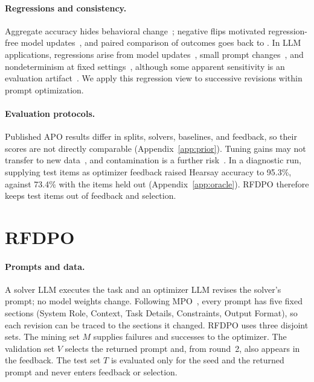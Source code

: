 \documentclass[11pt]{article}
\begin{document}
\paragraph{Regressions and consistency.}
Aggregate accuracy hides behavioral change~\citep{ribeiro2020checklist}; negative flips motivated regression-free model updates~\citep{yan2021positive}, and paired comparison of outcomes goes back to \citet{mcnemar1947sampling}. In LLM applications, regressions arise from model updates~\citep{ma2024regression,chen2023drift}, small prompt changes~\citep{salinas2024butterfly,sclar2024quantifying,errica2025wrong}, and nondeterminism at fixed settings~\citep{atil2025nondeterminism}, although some apparent sensitivity is an evaluation artifact~\citep{hua2025flaw}. We apply this regression view to successive revisions within prompt optimization.

\paragraph{Evaluation protocols.}
Published APO results differ in splits, solvers, baselines, and feedback, so their scores are not directly comparable (Appendix~\ref{app:prior}). Tuning gains may not transfer to new data~\citep{recht2019imagenet}, and contamination is a further risk~\citep{oren2023proving}. In a diagnostic run, supplying test items as optimizer feedback raised Hearsay accuracy to 95.3\%, against 73.4\% with the items held out (Appendix~\ref{app:oracle}). RFDPO therefore keeps test items out of feedback and selection.



\section{RFDPO}
\label{sec:method}

\paragraph{Prompts and data.}
A solver LLM executes the task and an optimizer LLM revises the solver's prompt; no model weights change. Following MPO~\citep{sharma2026mpo}, every prompt has five fixed sections (System Role, Context, Task Details, Constraints, Output Format), so each revision can be traced to the sections it changed. RFDPO uses three disjoint sets. The mining set $M$ supplies failures and successes to the optimizer. The validation set $V$ selects the returned prompt and, from round~2, also appears in the feedback. The test set $T$ is evaluated only for the seed and the returned prompt and never enters feedback or selection.
\end{document}
